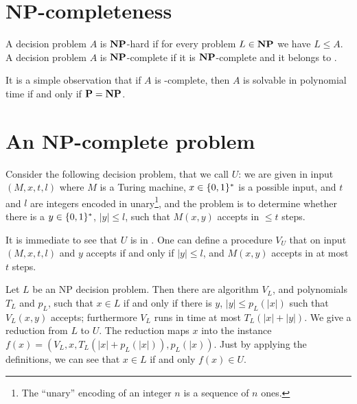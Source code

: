 \section*{NP-completeness}

A decision problem $A$ is $\np$-hard if for every 
problem $L \in \np$ we have $L \leq A$. A decision
problem $A$ is $\np$-complete if it is $\np$-complete
and it belongs to \np.

It is a simple observation that if $A$ is \np-complete,
then $A$ is solvable in polynomial time if and only if
$\p = \np$.

\section*{An NP-complete problem}

Consider the following decision problem, that we call $U$: we are given
in input $(M,x,t,l)$ where $M$ is a Turing machine,
$x\in \{0,1\}^*$ is a possible input, and $t$ and $l$ are integers
encoded in unary\footnote{The ``unary'' encoding of an integer
$n$ is a sequence of $n$ ones.}, and the problem is
to determine whether there is a $y \in \{0,1\}^*$, $|y| \leq l$,  such that
$M(x,y)$ accepts in $\leq t$ steps.

It is immediate to see that $U$ is in \np. One can define
a procedure $V_U$ that on input $(M,x,t,l)$ and $y$ accepts
if and only if $|y| \leq l$, and $M(x,y)$ accepts in at most $t$
steps.

Let $L$ be an NP decision problem. Then there are algorithm $V_L$,
and polynomials $T_L$ and $p_L$, such that $x\in L$ if and only
if there is $y$, $|y| \leq p_L(|x|)$ such that $V_L(x,y)$ accepts;
furthermore $V_L$ runs in time at most $T_L(|x| + |y|)$. We give
a reduction from $L$ to $U$. The reduction maps $x$
into the instance $f(x) = (V_L,x,T_L(|x|+p_L(|x|)),p_L(|x))$. Just by
applying the definitions, we can see that $x\in L$ if and
only $f(x) \in U$.

